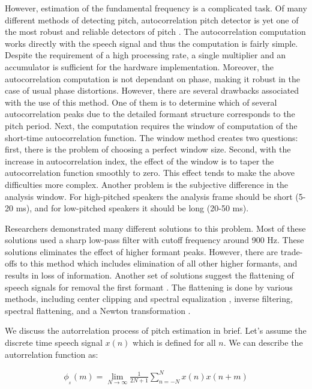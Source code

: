 However, estimation of the fundamental frequency is a complicated task. Of many different methods of detecting pitch, autocorrelation pitch detector is yet one of the most robust and reliable detectors of pitch \cite{pitch_rabi}. The autocorrelation computation works directly with the speech signal and thus the computation is fairly simple. Despite the requirement of  a high processing rate, a single multiplier and an accumulator is sufficient for the  hardware implementation. Moreover, the autocorrelation computation is not dependant on phase, making it robust in the case of usual phase distortions. However, there are several drawbacks associated with the use of this method. One of them is to determine which of several autocorrelation peaks due to the detailed formant structure corresponds to the pitch period. Next, the computation requires the window of computation of the short-time autocorrelation function. The window method creates two questions: first, there is the problem of choosing a perfect window size. Second, with the increase in autocorrelation index,  the effect of the window is to taper the autocorrelation function smoothly to zero. This effect tends to make the above difficulties more complex.  Another problem is the subjective difference in the analysis window.  For high-pitched speakers the analysis frame should be short (5-20 ms), and for low-pitched speakers it should be long (20-50 ms). 

Researchers demonstrated many different solutions to this problem. Most of these solutions used a sharp low-pass filter with cutoff frequency around 900 Hz. These solutions eliminates the effect of higher formant peaks. However, there are trade-offs to this method which includes elimination of all other higher formants, and results in loss of information. Another set of solutions suggest the flattening of speech signals for removal the first formant \cite{rabi_1, Sondhi}. The flattening is done by various methods, including center clipping and spectral equalization \cite{rabi_1}, inverse filtering, spectral flattening, and a Newton transformation \cite{markel}.

We discuss the autorrelation process of pitch estimation in brief. Let's assume the discrete time speech signal $x(n)$ which is defined for all $n$. We can describe the autorrelation function as:

\begin{align}
    {\phi__x} (m) = \lim_{N \to \infty} \frac{1}{2N + 1}\sum_{n=-N}^{N}x(n)x(n+m)
    \label{eqn:autocorr}
\end{align}


